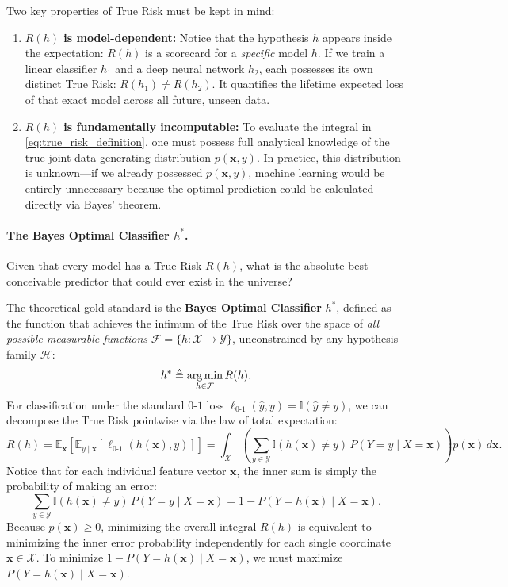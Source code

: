 Two key properties of True Risk must be kept in mind:
\begin{enumerate}[noitemsep]
  \item \textbf{$R(h)$ is model-dependent:} Notice that the hypothesis $h$ appears inside the expectation: $R(h)$ is a scorecard for a \emph{specific} model $h$. If we train a linear classifier $h_1$ and a deep neural network $h_2$, each possesses its own distinct True Risk: $R(h_1) \neq R(h_2)$. It quantifies the lifetime expected loss of that exact model across all future, unseen data.
  \item \textbf{$R(h)$ is fundamentally incomputable:} To evaluate the integral in \eqref{eq:true_risk_definition}, one must possess full analytical knowledge of the true joint data-generating distribution $p(\mathbf{x}, y)$. In practice, this distribution is unknown—if we already possessed $p(\mathbf{x}, y)$, machine learning would be entirely unnecessary because the optimal prediction could be calculated directly via Bayes' theorem.
\end{enumerate}

\paragraph{The Bayes Optimal Classifier $h^*$.}
Given that every model has a True Risk $R(h)$, what is the absolute best conceivable predictor that could ever exist in the universe? 

The theoretical gold standard is the \textbf{Bayes Optimal Classifier} $h^*$, defined as the function that achieves the infimum of the True Risk over the space of \emph{all possible measurable functions} $\mathcal{F} = \{h: \mathcal{X} \to \mathcal{Y}\}$, unconstrained by any hypothesis family $\mathcal{H}$:
\begin{equation}
h^* \triangleq \operatorname*{arg\,min}_{h \in \mathcal{F}} R(h).
\end{equation}
For classification under the standard $0$-$1$ loss $\ell_{0\text{-}1}(\hat{y}, y) = \mathbb{I}(\hat{y} \neq y)$, we can decompose the True Risk pointwise via the law of total expectation:
\begin{equation}
R(h) = \mathbb{E}_{\mathbf{x}}\left[ \mathbb{E}_{y \mid \mathbf{x}}[\ell_{0\text{-}1}(h(\mathbf{x}), y)] \right] = \int_{\mathcal{X}} \left( \sum_{y \in \mathcal{Y}} \mathbb{I}(h(\mathbf{x}) \neq y) \, P(Y = y \mid X = \mathbf{x}) \right) p(\mathbf{x}) \, d\mathbf{x}.
\end{equation}
Notice that for each individual feature vector $\mathbf{x}$, the inner sum is simply the probability of making an error:
\begin{equation}
\sum_{y \in \mathcal{Y}} \mathbb{I}(h(\mathbf{x}) \neq y) \, P(Y = y \mid X = \mathbf{x}) = 1 - P(Y = h(\mathbf{x}) \mid X = \mathbf{x}).
\end{equation}
Because $p(\mathbf{x}) \ge 0$, minimizing the overall integral $R(h)$ is equivalent to minimizing the inner error probability independently for each single coordinate $\mathbf{x} \in \mathcal{X}$. To minimize $1 - P(Y = h(\mathbf{x}) \mid X = \mathbf{x})$, we must maximize $P(Y = h(\mathbf{x}) \mid X = \mathbf{x})$. 

